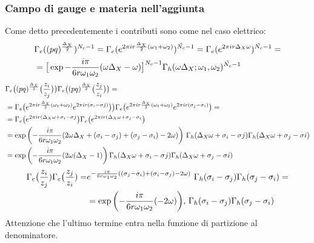 \documentclass[a4paper,12pt]{article}
\begin{document}
\subsubsection*{Campo di gauge e materia nell'aggiunta}
Come detto precedentemente i contributi sono come nel caso elettrico:
\begin{align*}
& \Gamma_e((pq)^{\frac{\Delta_X}{2}})^{N_c -1} =
\Gamma_e( e^{2 \pi i r  {\Delta_X \over 2} (\omega_1 + \omega_2)})^{\tilde{N_c}-1} =  \Gamma_e( e^{2 \pi i r  \Delta_X \omega })^{\tilde{N_c}-1} = \\
&=\big[ \exp{- \frac{i \pi} {6 r \omega_1 \omega_2 }  ( \omega \Delta_X - \omega) }\big]^{N_c-1} \Gamma_h ( \omega \Delta_X ; \omega_1, \omega_2)^{\tilde{N_c}-1}
\end{align*}
 \begin{align*}
 & \Gamma_e\big( (pq)^{\frac{\Delta_X}{2}} \big( { z_i \over z_j} \big) \big) \Gamma_e \big( (pq)^{\frac{\Delta_X}{2}} \big( { z_j \over z_i} \big) \big) = \\
&= \Gamma_e\big( e^{2 \pi i r \frac{\Delta_X}{2} (\omega_1 + \omega_2)} e^{ 2 \pi  i r (\sigma_i - \sigma j)} \big) \big) \Gamma_e \big( e^{ 2 \pi i r \frac{\Delta_X}{2} (\omega_1 + \omega_2)}  e^{ 2 \pi i r (\sigma_j - \sigma_i)} \big) =  \\
&= \Gamma_e\big( e^{2 \pi  i r (\Delta_X \omega +\sigma_i - \sigma j} \big) \Gamma_e \big(  e^{2 \pi  i r (\Delta_X \omega +\sigma_j - \sigma_i} \big) \\
 & = \exp \bigg( {- \frac{i \pi} {6 r \omega_1 \omega_2 }  ( 2 \omega \Delta_X + (\sigma_i - \sigma_j)+(\sigma_j - \sigma_i) - 2 \omega) }\bigg)\, \, \Gamma_h ( \Delta_X \omega + \sigma_i - \sigma j ) \Gamma_h ( \Delta_X \omega + \sigma_j - \sigma i) \\
 & = \exp\bigg({- \frac{i \pi} {6 r \omega_1 \omega_2 }  ( 2 \omega (\Delta_X - 1) }\bigg)  \, \Gamma_h ( \Delta_X \omega + \sigma_i - \sigma j ) \Gamma_h ( \Delta_X \omega + \sigma_j - \sigma i)
\end{align*}
\begin{align*}
  \Gamma_e\big( {z_i \over z_j})\Gamma_e\big( {z_j \over z_i}) = &e^{- \frac{i \pi} {6 r \omega_1 \omega_2 }  ( (\sigma_j - \sigma_i) + (\sigma_i- \sigma_j) - 2 \omega)} \, \, \Gamma_h (  \sigma_i - \sigma_j) \Gamma_h (  \sigma_j - \sigma_i) =\\
& = \exp \bigg( {- \frac{i \pi} {6 r \omega_1 \omega_2 }  ( - 2 \omega)}  \bigg) , \, \Gamma_h (  \sigma_i - \sigma_j) \Gamma_h (  \sigma_j - \sigma_i)
\end{align*}
Attenzione che l'ultimo termine entra nella funzione di partizione al denominatore.\\
\end{document}
